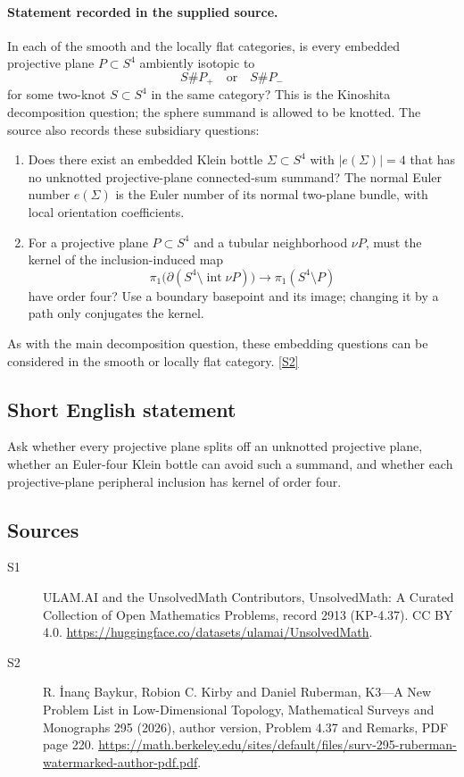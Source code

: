 \documentclass[11pt]{article}
\newcommand{\sref}[2]{\hyperlink{source:#1:#2}{[S#2]}}
\begin{document}
\paragraph{Statement recorded in the supplied source.}
In each of the smooth and the locally flat categories, is every embedded projective plane $P\subset S^4$ ambiently isotopic to
\[
S\#P_+\quad\text{or}\quad S\#P_-
\]
for some two-knot $S\subset S^4$ in the same category? This is the Kinoshita decomposition question; the sphere summand is allowed to be knotted. The source also records these subsidiary questions:
\begin{enumerate}
\item[(i)] Does there exist an embedded Klein bottle $\Sigma\subset S^4$ with $|e(\Sigma)|=4$ that has no unknotted projective-plane connected-sum summand? The normal Euler number $e(\Sigma)$ is the Euler number of its normal two-plane bundle, with local orientation coefficients.
\item[(ii)] For a projective plane $P\subset S^4$ and a tubular neighborhood $\nu P$, must the kernel of the inclusion-induced map
\[
\pi_1\bigl(\partial(S^4\setminus\operatorname{int}\nu P)\bigr)
\longrightarrow\pi_1(S^4\setminus P)
\]
have order four? Use a boundary basepoint and its image; changing it by a path only conjugates the kernel.
\end{enumerate}
As with the main decomposition question, these embedding questions can be considered in the smooth or locally flat category. \sref{2913}{2}
\subsection{Short English statement}
Ask whether every projective plane splits off an unknotted projective plane, whether an Euler-four Klein bottle can avoid such a summand, and whether each projective-plane peripheral inclusion has kernel of order four.
\subsection{Sources}
\begin{description}
\item[\hypertarget{source:2913:1}{S1}] ULAM.AI and the UnsolvedMath Contributors, UnsolvedMath: A Curated Collection of Open Mathematics Problems, record 2913 (KP-4.37). CC BY 4.0. \url{https://huggingface.co/datasets/ulamai/UnsolvedMath}.
\item[\hypertarget{source:2913:2}{S2}] R. İnanç Baykur, Robion C. Kirby and Daniel Ruberman, K3—A New Problem List in Low-Dimensional Topology, Mathematical Surveys and Monographs 295 (2026), author version, Problem 4.37 and Remarks, PDF page 220. \url{https://math.berkeley.edu/sites/default/files/surv-295-ruberman-watermarked-author-pdf.pdf}.
\end{description}
\label{end:2913}
\end{document}
